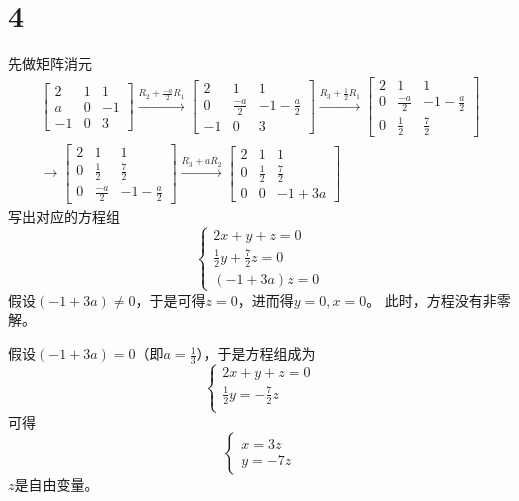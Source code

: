 \documentclass{article}
\begin{document}
\section*{4}

先做矩阵消元
\begin{align*}
  \begin{bmatrix}
    2  & 1 & 1  \\
    a  & 0 & -1 \\
    -1 & 0 & 3
  \end{bmatrix}
  \xrightarrow{R_2 + \frac{-a}{2}R_1}
  \begin{bmatrix}
    2  & 1            & 1                \\
    0  & \frac{-a}{2} & -1 - \frac{a}{2} \\
    -1 & 0            & 3
  \end{bmatrix}
  \xrightarrow{R_3 + \frac{1}{2}R_1}
  \begin{bmatrix}
    2 & 1            & 1                \\
    0 & \frac{-a}{2} & -1 - \frac{a}{2} \\
    0 & \frac{1}{2}  & \frac{7}{2}
  \end{bmatrix} \\
  \xrightarrow{}
  \begin{bmatrix}
    2 & 1            & 1                \\
    0 & \frac{1}{2}  & \frac{7}{2}      \\
    0 & \frac{-a}{2} & -1 - \frac{a}{2}
  \end{bmatrix}
  \xrightarrow{R_3 + a R_2}
  \begin{bmatrix}
    2 & 1           & 1           \\
    0 & \frac{1}{2} & \frac{7}{2} \\
    0 & 0           & -1 + 3a
  \end{bmatrix}
\end{align*}
写出对应的方程组
\begin{equation*}
  \begin{cases*}
    2x + y + z = 0                  \\
    \frac{1}{2}y + \frac{7}{2}z = 0 \\
    (-1 + 3a) z = 0
  \end{cases*}
\end{equation*}
假设$(-1 + 3a) \neq 0$，于是可得$z = 0$，进而得$y = 0, x = 0$。
此时，方程没有非零解。

假设$(-1 + 3a) = 0$（即$a = \frac{1}{3}$），于是方程组成为
\begin{equation*}
  \begin{cases*}
    2x + y + z = 0                \\
    \frac{1}{2}y = - \frac{7}{2}z \\
  \end{cases*}
\end{equation*}
可得
\begin{equation*}
  \begin{cases*}
    x = 3 z \\
    y = -7 z
  \end{cases*}
\end{equation*}
$z$是自由变量。
\end{document}
